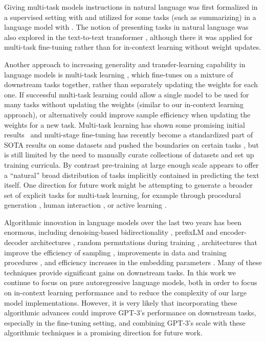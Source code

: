 Giving multi-task models instructions in natural language was first formalized in a supervised setting with \cite{mccann2018natural} and utilized for some tasks (such as summarizing) in a language model with \cite{radford2019language}.  The notion of presenting tasks in natural language was also explored in the text-to-text transformer  \cite{raffel2019t5}, although there it was applied for multi-task fine-tuning rather than for in-context learning without weight updates.

Another approach to increasing generality and transfer-learning capability in language models is multi-task learning \cite{caruana1997multitask}, which fine-tunes on a mixture of downstream tasks together, rather than separately updating the weights for each one.  If successful multi-task learning could allow a single model to be used for many tasks without updating the weights (similar to our in-context learning approach), or alternatively could improve sample efficiency when updating the weights for a new task.  Multi-task learning has shown some promising initial results~\citep{liu2015representation, liu2018generating} and multi-stage fine-tuning has recently become a standardized part of SOTA results on some datasets \cite{phang2018sentence} and pushed the boundaries on certain tasks \cite{khashabi2020unifiedqa}, but is still limited by the need to manually curate collections of datasets and set up training curricula.  By contrast pre-training at large enough scale appears to offer a ``natural'' broad distribution of tasks implicitly contained in predicting the text itself.  One direction for future work might be attempting to generate a broader set of explicit tasks for multi-task learning, for example through procedural generation \cite{tobin2017domain}, human interaction \cite{Ziegler2019FineTuningLM}, or active learning \cite{mackay1992active}.

Algorithmic innovation in language models over the last two years has been enormous, including denoising-based bidirectionality \cite{devlin2018bert}, prefixLM \cite{dai2015semi} and encoder-decoder architectures \cite{lewis2019bart,raffel2019t5}, random permutations during training \cite{yang2019xlnet}, architectures that improve the efficiency of sampling \cite{dai2019transformerXL}, improvements in data and training procedures \cite{liu2019roberta}, and efficiency increases in the embedding parameters \cite{lan2019albert}.  Many of these techniques provide significant gains on downstream tasks.  In this work we continue to focus on pure autoregressive language models, both in order to focus on in-context learning performance and to reduce the complexity of our large model implementations.  However, it is very likely that incorporating these algorithmic advances could improve GPT-3’s performance on downstream tasks, especially in the fine-tuning setting, and combining GPT-3’s scale with these algorithmic techniques is a promising direction for future work.
